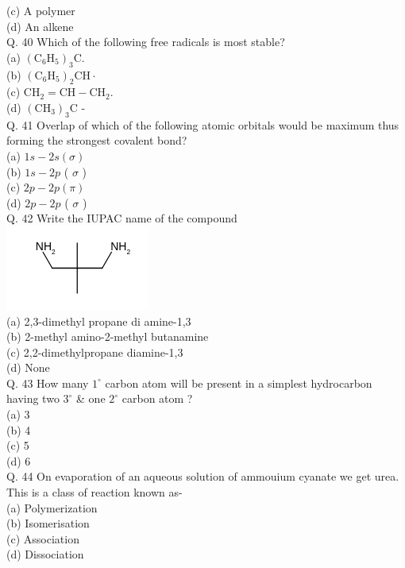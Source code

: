 \documentclass[10pt]{article}
\begin{document}
(c) A polymer\\
(d) An alkene\\
Q. 40 Which of the following free radicals is most stable?\\
(a) $\left(\mathrm{C}_{6} \mathrm{H}_{5}\right)_{3} \mathrm{C}$.\\
(b) $\left(\mathrm{C}_{6} \mathrm{H}_{5}\right)_{2} \mathrm{CH} \cdot$\\
(c) $\mathrm{CH}_{2}=\mathrm{CH}-\mathrm{CH}_{2}$.\\
(d) $\left(\mathrm{CH}_{3}\right)_{3} \mathrm{C}$ -\\
Q. 41 Overlap of which of the following atomic orbitals would be maximum thus forming the strongest covalent bond?\\
(a) $1 s-2 s(\sigma)$\\
(b) $1 s-2 p$ ( $\sigma$ )\\
(c) $2 p-2 p(\pi)$\\
(d) $2 p-2 p$ ( $\sigma$ )\\
Q. 42 Write the IUPAC name of the compound\\
\includegraphics{smile-8c42379a50dbcea5b23f106066e2ac354f9bbe13}\\
(a) 2,3-dimethyl propane di amine-1,3\\
(b) 2-methyl amino-2-methyl butanamine\\
(c) 2,2-dimethylpropane diamine-1,3\\
(d) None\\
Q. 43 How many $1^{\circ}$ carbon atom will be present in a simplest hydrocarbon having two $3^{\circ}$ \& one $2^{\circ}$ carbon atom ?\\
(a) 3\\
(b) 4\\
(c) 5\\
(d) 6\\
Q. 44 On evaporation of an aqueous solution of ammouium cyanate we get urea. This is a class of reaction known as-\\
(a) Polymerization\\
(b) Isomerisation\\
(c) Association\\
(d) Dissociation\\
\end{document}
